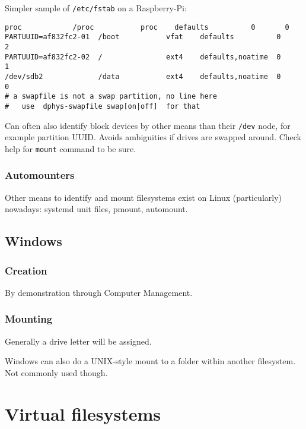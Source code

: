 \documentclass[slides]{pgnotes}
\begin{document}
Simpler sample of \texttt{/etc/fstab} on a Raspberry-Pi:

\begin{verbatim}
proc            /proc           proc    defaults          0       0
PARTUUID=af832fc2-01  /boot           vfat    defaults          0       2
PARTUUID=af832fc2-02  /               ext4    defaults,noatime  0       1
/dev/sdb2             /data           ext4    defaults,noatime  0       0
# a swapfile is not a swap partition, no line here
#   use  dphys-swapfile swap[on|off]  for that
\end{verbatim}

Can often also identify block devices by other means than their
\texttt{/dev} node, for example partition UUID. Avoids ambiguities if
drives are swapped around. Check help for \texttt{mount} command to be
sure.

\subsubsection{Automounters}\label{automounters}

Other means to identify and mount filesystems exist on Linux
(particularly) nowadays: systemd unit files, pmount, automount.

\subsection{Windows}\label{windows}

\subsubsection{Creation}\label{creation-1}

By demonstration through Computer Management.

\subsubsection{Mounting}\label{mounting-1}

Generally a drive letter will be assigned.

Windows can also do a UNIX-style mount to a folder within another
filesystem. Not commonly used though.

\section{Virtual filesystems}
\label{sec:virtual-filesystems}
\end{document}
